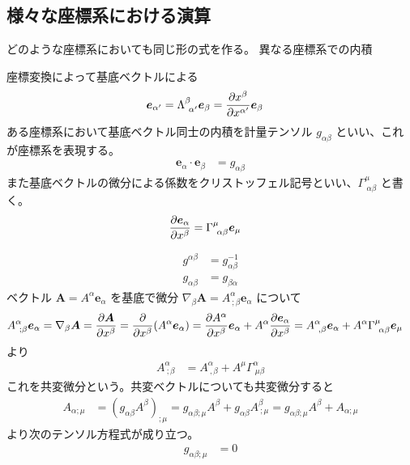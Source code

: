 \documentclass[uplatex,dvipdfmx,a4paper,11pt]{jlreq}
\renewcommand{\AA}{\bm{A}}
\newcommand{\ee}{\bm{e}}
\theoremstyle{definition}
\begin{document}
\subsection{様々な座標系における演算}
どのような座標系においても同じ形の式を作る。
異なる座標系での内積
\begin{definition}[座標系の基底ベクトル]
  座標変換によって基底ベクトルによる
  \begin{align}
    \ee_{\alpha'} & = \Lambda_{\ \alpha'}^\beta\ee_\beta = \diffp{x^\beta}{x^{\alpha'}}\ee_\beta
  \end{align}
  ある座標系において基底ベクトル同士の内積を計量テンソル $g_{\alpha\beta}$ といい、これが座標系を表現する。
  \begin{align}
    \ee_\alpha\cdot\ee_\beta & = g_{\alpha\beta}
  \end{align}
  また基底ベクトルの微分による係数をクリストッフェル記号といい、$\Gamma^\mu_{\ \alpha\beta}$ と書く。
  \begin{align}
    \diffp{\ee_\alpha}{x^\beta} & = \Gamma^\mu_{\ \alpha\beta}\ee_\mu
  \end{align}
\end{definition}
\begin{align}
  g^{\alpha\beta} & = g_{\alpha\beta}^{-1} \\
  g_{\alpha\beta} & = g_{\beta\alpha}
\end{align}
ベクトル $\AA = A^\alpha\ee_\alpha$ を基底で微分 $\nabla_\beta\AA = A^\alpha_{\ ;\beta}\ee_\alpha$ について
\begin{align}
  A^\alpha_{\ ;\beta}\ee_\alpha & = \nabla_\beta\AA = \diffp{\AA}{x^\beta} = \diffp{}{x^\beta}(A^\alpha\ee_\alpha) = \diffp{A^\alpha}{x^\beta}\ee_\alpha + A^\alpha\diffp{\ee_\alpha}{x^\beta} = A^\alpha_{\ ,\beta}\ee_\alpha + A^\alpha\Gamma^\mu_{\ \alpha\beta}\ee_\mu
\end{align}
より
\begin{align}
  A^\alpha_{\ ;\beta} & = A^\alpha_{\ ,\beta} + A^\mu\Gamma^\alpha_{\ \mu\beta}
\end{align}
これを共変微分という。共変ベクトルについても共変微分すると
\begin{align}
  A_{\alpha;\mu} & = (g_{\alpha\beta}A^{\beta})_{;\mu} = g_{\alpha\beta;\mu}A^{\beta} + g_{\alpha\beta}A^{\beta}_{\ ;\mu} = g_{\alpha\beta;\mu}A^{\beta} + A_{\alpha;\mu}
\end{align}
より次のテンソル方程式が成り立つ。
\begin{align}
  g_{\alpha\beta;\mu} & = 0
\end{align}
\end{document}
